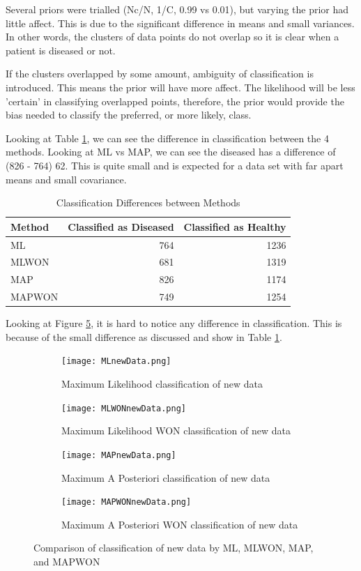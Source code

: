 {{Several priors were trialled (Nc/N, 1/C, 0.99 vs 0.01), but varying the prior had little affect. This is due to the significant difference in means and small variances. In other words, the clusters of data points do not overlap so it is clear when a patient is diseased or not. 

If the clusters overlapped by some amount, ambiguity of classification is introduced. This means the prior will have more affect. The likelihood will be less 'certain' in classifying overlapped points, therefore, the prior would provide the bias needed to classify the preferred, or more likely, class.

Looking at Table \ref{t:classNumber}, we can see the difference in classification between the 4 methods. Looking at ML vs MAP, we can see the diseased has a difference of (826 - 764) 62. This is quite small and is expected for a data set with far apart means and small covariance. 



\begin{table}[h]
	\centering
	\caption{Classification Differences between Methods}
	\label{t:classNumber}
	\begin{tabular}{lrr}
		\hline
		\textbf{Method} & \textbf{Classified as Diseased} & \textbf{Classified as Healthy}\\ \hline
		ML & 764 & 1236 \\
		MLWON& 681 & 1319 \\
		MAP & 826 & 1174  \\
		MAPWON & 749 & 1254 \\
	\end{tabular}
\end{table}

Looking at Figure \ref{fig:overallC}, it is hard to notice any difference in classification. This is because of the small difference as discussed and show in Table \ref{t:classNumber}.

\begin{figure}[h!] 
	\centering
	\begin{subfigure}[b]{.49\textwidth}
		\texttt{[image: MLnewData.png]}
		\caption{Maximum Likelihood classification of new data}
		\label{fig:model0}
	\end{subfigure}
	\begin{subfigure}[b]{.49\textwidth}
		\texttt{[image: MLWONnewData.png]}
		\caption{Maximum Likelihood WON classification of new data}
		\label{fig:model1}
	\end{subfigure}
	\begin{subfigure}[b]{.49\textwidth}
		\texttt{[image: MAPnewData.png]}
		\caption{Maximum A Posteriori classification of new data}
		\label{fig:model2}
	\end{subfigure}
	\begin{subfigure}[b]{.49\textwidth}
		\texttt{[image: MAPWONnewData.png]}
		\caption{Maximum A Posteriori WON classification of new data}
		\label{fig:model3}
	\end{subfigure}
	\caption{Comparison of classification of new data by ML, MLWON, MAP, and MAPWON}
	\label{fig:overallC}
\end{figure}

}}
